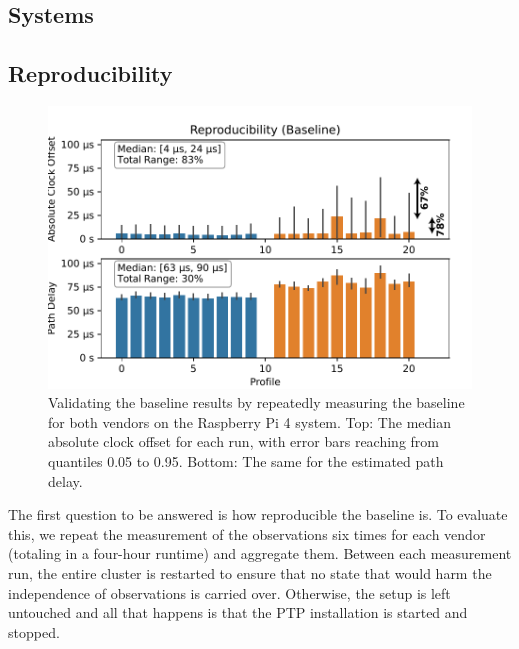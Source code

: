 \subsection{Systems}

\subsection{Reproducibility}

\renewcommand{\ptpKeyPrefix}{/reproducibility/rpi-4}

\begin{figure}
    \includegraphics[width=\linewidth]{res/generated/baseline/key_metric_variance.pdf}
    \caption{Validating the baseline results by repeatedly measuring the baseline for both vendors on the Raspberry Pi 4 system. Top: The median absolute clock offset for each run, with error bars reaching from quantiles 0.05 to 0.95. Bottom: The same for the estimated path delay.}
    \label{fig:baseline_reproducibility}
\end{figure}

The first question to be answered is how reproducible the baseline is. To evaluate this, we repeat the measurement of the observations six times for each vendor (totaling in a four-hour runtime) and aggregate them. Between each measurement run, the entire cluster is restarted to ensure that no state that would harm the independence of observations is carried over. Otherwise, the setup is left untouched and all that happens is that the PTP installation is started and stopped.

